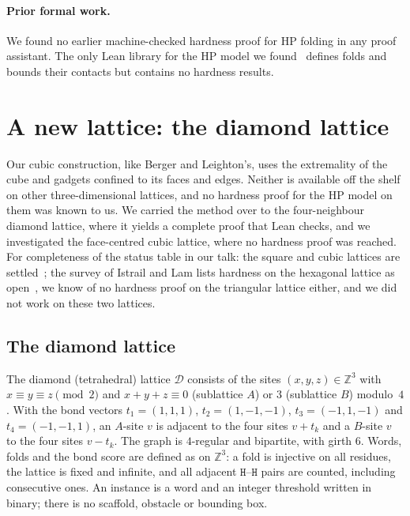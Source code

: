 \documentclass[11pt,letterpaper]{article}
\theoremstyle{definition}
\theoremstyle{remark}
\newcommand{\Hh}{\mathtt{H}}
\newcommand{\Z}{\mathbb{Z}}
\begin{document}
\paragraph{Prior formal work.}
We found no earlier machine-checked hardness proof for HP folding in any proof assistant. The only
Lean library for the HP model we found~\cite{Ptyche} defines folds and bounds their contacts but
contains no hardness results.

\section{A new lattice: the diamond lattice}\label{sec:new}

Our cubic construction, like Berger and Leighton's, uses the extremality of the cube and gadgets
confined to its faces and edges. Neither is available off the shelf on other three-dimensional
lattices, and no hardness proof for the HP model on them was known to us. We carried the method
over to the four-neighbour diamond lattice, where it yields a complete proof that Lean checks, and
we investigated the face-centred cubic lattice, where no hardness proof was reached. For completeness of the status
table in our talk: the square and cubic lattices are settled~\cite{CGPPY98,BL98}; the survey of
Istrail and Lam lists hardness on the hexagonal lattice as open~\cite{IL09}, we know of no hardness
proof on the triangular lattice either, and we did not work on these two lattices.

\subsection{The diamond lattice}

The diamond (tetrahedral) lattice $\mathcal D$ consists of the sites $(x,y,z)\in\Z^3$ with
$x\equiv y\equiv z\pmod 2$ and $x+y+z\equiv0$ (sublattice $A$) or $3$ (sublattice $B$) modulo~$4$. With
the bond vectors $t_1=(1,1,1)$, $t_2=(1,-1,-1)$, $t_3=(-1,1,-1)$ and $t_4=(-1,-1,1)$, an $A$-site $v$
is adjacent to the four sites $v+t_k$ and a $B$-site $v$ to the four sites $v-t_k$. The graph is
$4$-regular and bipartite, with girth $6$. Words, folds and the bond score are defined as on $\Z^3$:
a fold is injective on all residues, the lattice is fixed and infinite, and all adjacent
$\Hh$--$\Hh$ pairs are counted, including consecutive ones. An instance is a word and an integer
threshold written in binary; there is no scaffold, obstacle or bounding box.
\end{document}
